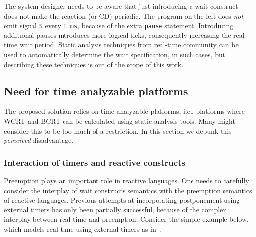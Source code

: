 The system designer needs to be aware that just introducing a wait
construct does not make the reaction (or CD) periodic. The program on
the left does \textit{not} emit signal \texttt{S} every \texttt{1 ms},
because of the extra \texttt{pause} statement. Introducing additional
pauses introduces more logical ticks, consequently increasing the
real-time wait period. Static analysis techniques from real-time
community can be used to automatically determine the wait specification,
in such cases, but describing these techniques is out of the scope of
this work.

\subsection{Need for time analyzable platforms}
\label{sec:need-time-analyzable}

The proposed solution relies on time analyzable platforms, i.e.,
platforms where WCRT and BCRT can be calculated using static analysis
tools. Many might consider this to be too much of a restriction. In this
section we debunk this \textit{perceived} disadvantage.

\subsubsection{Interaction of timers and reactive constructs}
\label{sec:inter-timers-react}


Preemption plays an important role in reactive languages. One needs to
carefully consider the interplay of wait constructs semantics with the
preemption semantics of reactive languages. Previous attempts at
incorporating postponement using external timers has only been partially
successful, because of the complex interplay between real-time and
preemption. Consider the simple example below, which models real-time
using external timers as in~\cite{rsh94}.

